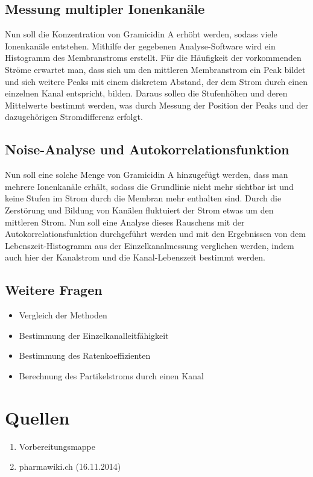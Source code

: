 \documentclass[a4paper,ngerman]{scrartcl}
\begin{document}
\subsection{Messung multipler Ionenkanäle}
\label{sec:multiplechannels}
Nun soll die Konzentration von Gramicidin A erhöht werden, sodass viele Ionenkanäle entstehen. 
Mithilfe der gegebenen Analyse-Software wird ein Histogramm des Membranstroms erstellt. 
Für die Häufigkeit der vorkommenden Ströme erwartet man, dass sich um den mittleren Membranstrom ein Peak bildet und sich weitere Peaks mit einem diskretem Abstand, der dem Strom durch einen einzelnen Kanal entspricht, bilden.
Daraus sollen die Stufenhöhen und deren Mittelwerte bestimmt werden, was durch Messung der Position der Peaks und der dazugehörigen Stromdifferenz erfolgt.

\subsection{Noise-Analyse und Autokorrelationsfunktion}
\label{sec:noise-autocorr}
Nun soll eine solche Menge von Gramicidin A hinzugefügt werden, dass man mehrere Ionenkanäle erhält, sodass die Grundlinie nicht mehr sichtbar ist und keine Stufen im Strom durch die Membran mehr enthalten sind. 
Durch die Zerstörung und Bildung von Kanälen fluktuiert der Strom etwas um den mittleren Strom.
Nun soll eine Analyse dieses Rauschens mit der Autokorrelationsfunktion durchgeführt werden und
mit den Ergebnissen von dem Lebenszeit-Histogramm aus der Einzelkanalmessung verglichen werden, indem auch hier der Kanalstrom und die Kanal-Lebenszeit bestimmt werden. 
\subsection{Weitere Fragen}
\label{sec:weitere-fragen}

\begin{itemize}
\item Vergleich der Methoden
\item Bestimmung der Einzelkanalleitfähigkeit
\item Bestimmung des Ratenkoeffizienten
\item Berechnung des Partikelstroms durch einen Kanal
\end{itemize}













\section{Quellen}
\begin{enumerate}
\item Vorbereitungsmappe \label{ref:mappe}
\item pharmawiki.ch (16.11.2014) \label{ref:pharmawiki}
\end{enumerate}
\end{document}
